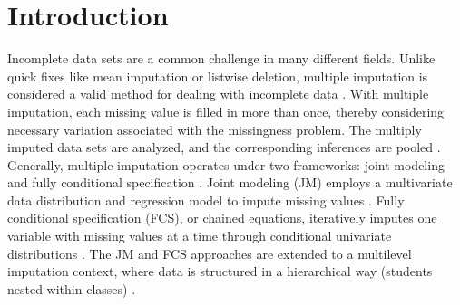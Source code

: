 \documentclass[10pt, a4paper, titlepage]{article}
\begin{document}
\section{Introduction}
Incomplete data sets are a common challenge in many different fields. Unlike quick fixes like mean imputation or listwise deletion, multiple imputation is considered a valid method for dealing with incomplete data \cite{mistlerComparisonJointModel2017, buurenFlexibleImputationMissing2018}. With multiple imputation, each missing value is filled in more than once, thereby considering necessary variation associated with the missingness problem. The multiply imputed data sets are analyzed, and the corresponding inferences are pooled \cite{buurenFlexibleImputationMissing2018, austin2021}. Generally, multiple imputation operates under two frameworks: joint modeling and fully conditional specification \cite{mistlerComparisonJointModel2017, buurenFlexibleImputationMissing2018}. Joint modeling (JM) employs a multivariate data distribution and regression model to impute missing values \cite{buurenFlexibleImputationMissing2018, enders2018}. Fully conditional specification (FCS), or chained equations, iteratively imputes one variable with missing values at a time through conditional univariate distributions \cite{enders2018, buurenFlexibleImputationMissing2018}. The JM and FCS approaches are extended to a multilevel imputation context, where data is structured in a hierarchical way (students nested within classes) \cite{mistlerComparisonJointModel2017}.
\end{document}
